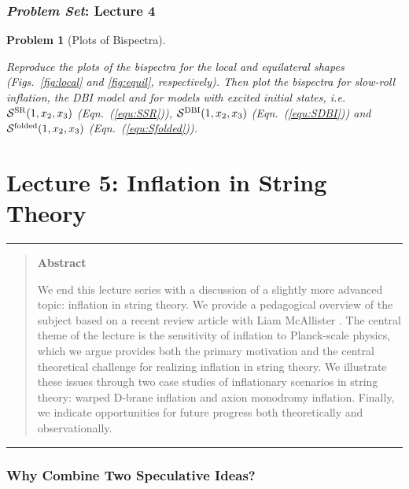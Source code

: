 \documentclass[12pt,letterpaper,rotate]{article}
\newtheorem{thmP}{Problem}
\begin{document}
{\newpage
\section{{\sl Problem Set}: Lecture 4}

\vskip 10pt
\begin{thmP}[Plots of Bispectra]\label{ex:bispectra}

Reproduce the plots of the bispectra for the local and equilateral shapes (Figs.~\ref{fig:local} and \ref{fig:equil}, respectively).
Then plot the bispectra for slow-roll inflation, the DBI model and for models with excited initial states, {\it i.e.}~${\cal S}^{\rm SR}(1,x_2,x_3)$ (Eqn.~(\ref{equ:SSR})), ${\cal S}^{\rm DBI}(1,x_2,x_3)$ (Eqn.~(\ref{equ:SDBI})) and ${\cal S}^{\rm folded}(1,x_2,x_3)$ (Eqn.~(\ref{equ:Sfolded})).


\end{thmP}
\newpage


\newpage
\part{Lecture 5: Inflation in String Theory}

\vspace{0.5cm}
 \hrule \vspace{0.3cm}
\begin{quote}
{\bf Abstract}

\noindent
We end this lecture series with a discussion of a slightly more advanced topic: inflation in string theory.
We provide a pedagogical overview of the subject based on a recent review article with Liam McAllister \cite{BMReview}.
The central theme of the lecture is the sensitivity of inflation to Planck-scale physics, which we argue provides both the primary motivation and the central theoretical challenge for realizing inflation in string theory.
We illustrate these issues through two case studies of
inflationary scenarios in string theory: warped D-brane inflation and axion monodromy inflation. 
Finally, we indicate opportunities for future progress both theoretically and observationally.
\end{quote}
\vspace{0.1cm}  \hrule
 \vspace{0.5cm}


\section{Why Combine Two Speculative Ideas?}

}
\end{document}
